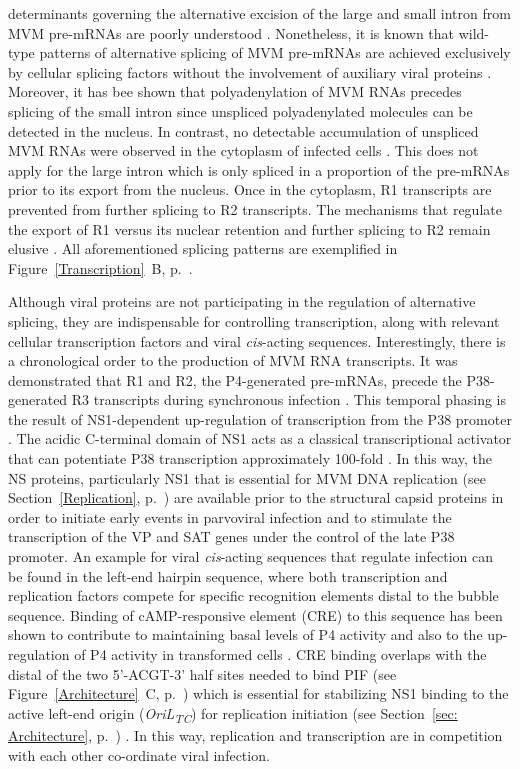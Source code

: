 determinants governing the alternative excision of the large and small intron from MVM pre-mRNAs are poorly understood \cite{pmid9499034, pmid10329570, pmid8151756, pmid7666519, pmid7637034, pmid9858560}. Nonetheless, it is known that wild-type patterns of alternative splicing of MVM pre-mRNAs are achieved exclusively by cellular splicing factors without the involvement of auxiliary viral proteins \cite{pmid1592259}. Moreover, it has bee shown that polyadenylation of MVM RNAs precedes splicing of the small intron since unspliced polyadenylated molecules can be detected in the nucleus. In contrast, no detectable accumulation of unspliced MVM RNAs were observed in the cytoplasm of infected cells \cite{pmid3346950}. This does not apply for the large intron which is only spliced in a proportion of the pre-mRNAs prior to its export from the nucleus. Once in the cytoplasm, R1 transcripts are prevented from further splicing to R2 transcripts. The mechanisms that regulate the export of R1 versus its nuclear retention and further splicing to R2 remain elusive \cite{Transcription}. All aforementioned splicing patterns are exemplified in Figure~\ref{Transcription}~B, p.~\pageref{Transcription}. 

Although viral proteins are not participating in the regulation of alternative splicing, they are indispensable for controlling transcription, along with relevant cellular transcription factors and viral \textit{cis}-acting sequences. Interestingly, there is a chronological order to the production of MVM RNA transcripts. It was demonstrated that R1 and R2, the P4-generated pre-mRNAs, precede the P38-generated R3 transcripts during synchronous infection \cite{pmid3346950}. This temporal phasing is the result of NS1-dependent up-regulation of transcription from the P38 promoter \cite{pmid3171551, pmid4020972}. The acidic C-terminal domain of NS1 acts as a classical transcriptional activator that can potentiate P38 transcription approximately 100-fold \cite{pmid1388209}. In this way, the NS proteins, particularly NS1 that is essential for MVM DNA replication (see Section~\ref{Replication}, p.~\pageref{Replication}) are available prior to the structural capsid proteins in order to initiate early events in parvoviral infection and to stimulate the transcription of the VP and SAT genes under the control of the late P38 promoter. An example for viral \textit{cis}-acting sequences that regulate infection can be found in the left-end hairpin sequence, where both transcription and replication factors compete for specific recognition elements distal to the bubble sequence. Binding of cAMP-responsive element (CRE) to this sequence has been shown to contribute to maintaining basal levels of P4 activity and also to the up-regulation of P4 activity in transformed cells \cite{pmid7636996, pmid8627649}. CRE binding overlaps with the distal of the two 5'-ACGT-3' half sites needed to bind PIF (see Figure~\ref{Architecture}~C, p.~\pageref{Architecture}) which is essential for stabilizing NS1 binding to the active left-end origin (\textit{OriL\textsubscript{TC}}) for replication initiation (see Section~\ref{sec: Architecture}, p.~\pageref{sec: Architecture}) \cite{pmid12050365}. In this way, replication and transcription are in competition with each other co-ordinate viral infection.            

